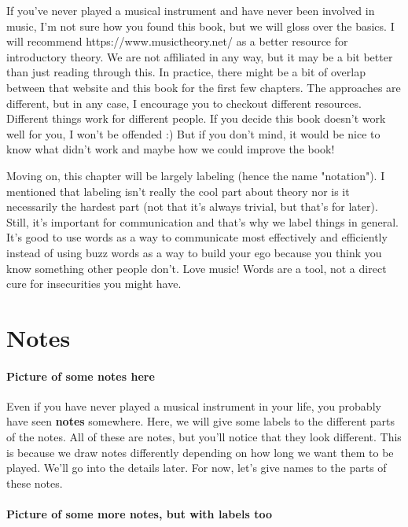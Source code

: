 \documentclass[../OpenAppliedMusicTheory.tex]{subfiles}
\begin{document}
    

    If you've never played a musical instrument and have never been involved in music, I'm not sure how you found this book, but we will gloss over the basics. I will recommend https://www.musictheory.net/ as a better resource for introductory theory. We are not affiliated in any way, but it may be a bit better than just reading through this. In practice, there might be a bit of overlap between that website and this book for the first few chapters. The approaches are different, but in any case, I encourage you to checkout different resources. Different things work for different people. If you decide this book doesn't work well for you, I won't be offended :) But if you don't mind, it would be nice to know what didn't work and maybe how we could improve the book!

    Moving on, this chapter will be largely labeling (hence the name "notation"). I mentioned that labeling isn't really the cool part about theory nor is it necessarily the hardest part (not that it's always trivial, but that's for later). Still, it's important for communication and that's why we label things in general. It's good to use words as a way to communicate most effectively and efficiently instead of using buzz words as a way to build your ego because you think you know something other people don't. Love music! Words are a tool, not a direct cure for insecurities you might have.

    \section{Notes}\label{ch1:notes}
        \paragraph{Picture of some notes here}

        Even if you have never played a musical instrument in your life, you probably have seen \textbf{notes} somewhere. Here, we will give some labels to the different parts of the notes. All of these are notes, but you'll notice that they look different. This is because we draw notes differently depending on how long we want them to be played. We'll go into the details later. For now, let's give names to the parts of these notes.

        \paragraph{Picture of some more notes, but with labels too}
\end{document}
